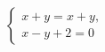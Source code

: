 \begin{ex}
	\begin{condition}
		\( \left\{
		\begin{array}{l}
			x+y=x+y,\\
			x-y+2=0
		\end{array}
		\right. \)
	\end{condition}
\end{ex}